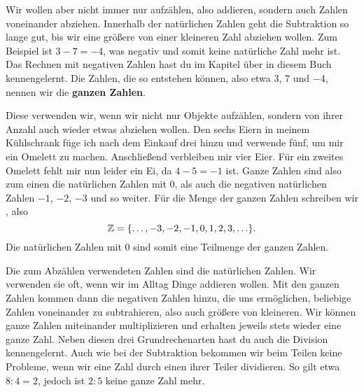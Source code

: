 \documentclass[../../main.tex]{subfiles}
\begin{document}

	Wir wollen aber nicht immer nur aufzählen, also addieren, sondern auch Zahlen voneinander abziehen. Innerhalb der natürlichen Zahlen geht die Subtraktion so lange gut, bis wir eine größere von einer kleineren Zahl abziehen wollen. Zum Beispiel ist $3-7=-4$, was negativ und somit keine natürliche Zahl mehr ist. Das Rechnen mit negativen Zahlen hast du im Kapitel über  in diesem Buch kennengelernt. Die Zahlen, die so entstehen können, also etwa 3, 7 und $-4$, nennen wir die \textbf{ganzen Zahlen}.
	
	Diese verwenden wir, wenn wir nicht nur Objekte aufzählen, sondern von ihrer Anzahl auch wieder etwas abziehen wollen. Den sechs Eiern in meinem Kühlschrank füge ich nach dem Einkauf drei hinzu und verwende fünf, um mir ein Omelett zu machen. Anschließend verbleiben mir vier Eier. Für ein zweites Omelett fehlt mir nun leider ein Ei, da $4-5=-1$ ist. Ganze Zahlen sind also zum einen die natürlichen Zahlen mit $0$, als auch die negativen natürlichen Zahlen $-1$, $-2$, $-3$ und so weiter. Für die Menge der ganzen Zahlen schreiben wir \Integer, also
	\[\mathbb{Z} = \{\ldots, -3, -2, -1, 0, 1, 2, 3, \ldots\}.\]
	Die natürlichen Zahlen mit $0$ sind somit eine Teilmenge der ganzen Zahlen.
	
	Die zum Abzählen verwendeten Zahlen sind die natürlichen Zahlen. Wir verwenden sie oft, wenn wir im Alltag Dinge addieren wollen. Mit den ganzen Zahlen kommen dann die negativen Zahlen hinzu, die uns ermöglichen, beliebige Zahlen voneinander zu subtrahieren, also auch größere von kleineren. Wir können ganze Zahlen miteinander multiplizieren und erhalten jeweils stets wieder eine ganze Zahl. Neben diesen drei Grundrechenarten hast du auch die Division kennengelernt. Auch wie bei der Subtraktion bekommen wir beim Teilen keine Probleme, wenn wir eine Zahl durch einen ihrer Teiler dividieren. So gilt etwa $8 : 4 = 2$, jedoch ist $2 : 5$ keine ganze Zahl mehr.
\end{document}
